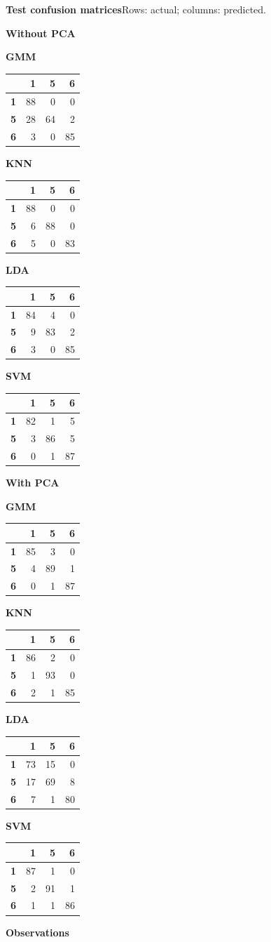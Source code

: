 \documentclass[11pt,a4paper]{article}
\makeatletter
\renewcommand{\arraystretch}{1.12}
\newcommand{\sectiongap}{\par\vspace{9mm}}
\newcommand{\confusion}[3]{%
  \begin{minipage}[t]{0.24\linewidth}
  \setlength{\parskip}{0pt}\centering
  \textbf{#1}\par\vspace{4pt}
  {\normalsize\setlength{\tabcolsep}{2.5pt}%
  \renewcommand{\arraystretch}{1.02}%
  \begin{tabular}{r@{\quad}#2}\toprule
  #3
  \bottomrule\end{tabular}}
  \end{minipage}}
\makeatother
\begin{document}
\noindent\begin{minipage}{\linewidth}
\textbf{Test confusion matrices}\hfill{\footnotesize Rows: actual; columns: predicted.}\par\smallskip
\textbf{Without PCA}\par\smallskip
\confusion{GMM}{rrr}{
 & \textbf{1} & \textbf{5} & \textbf{6} \\ \midrule
\textbf{1} & 88 & 0 & 0 \\
\textbf{5} & 28 & 64 & 2 \\
\textbf{6} & 3 & 0 & 85 \\
}\hfill
\confusion{KNN}{rrr}{
 & \textbf{1} & \textbf{5} & \textbf{6} \\ \midrule
\textbf{1} & 88 & 0 & 0 \\
\textbf{5} & 6 & 88 & 0 \\
\textbf{6} & 5 & 0 & 83 \\
}\hfill
\confusion{LDA}{rrr}{
 & \textbf{1} & \textbf{5} & \textbf{6} \\ \midrule
\textbf{1} & 84 & 4 & 0 \\
\textbf{5} & 9 & 83 & 2 \\
\textbf{6} & 3 & 0 & 85 \\
}\hfill
\confusion{SVM}{rrr}{
 & \textbf{1} & \textbf{5} & \textbf{6} \\ \midrule
\textbf{1} & 82 & 1 & 5 \\
\textbf{5} & 3 & 86 & 5 \\
\textbf{6} & 0 & 1 & 87 \\
}
\par\medskip
\textbf{With PCA}\par\smallskip
\confusion{GMM}{rrr}{
 & \textbf{1} & \textbf{5} & \textbf{6} \\ \midrule
\textbf{1} & 85 & 3 & 0 \\
\textbf{5} & 4 & 89 & 1 \\
\textbf{6} & 0 & 1 & 87 \\
}\hfill
\confusion{KNN}{rrr}{
 & \textbf{1} & \textbf{5} & \textbf{6} \\ \midrule
\textbf{1} & 86 & 2 & 0 \\
\textbf{5} & 1 & 93 & 0 \\
\textbf{6} & 2 & 1 & 85 \\
}\hfill
\confusion{LDA}{rrr}{
 & \textbf{1} & \textbf{5} & \textbf{6} \\ \midrule
\textbf{1} & 73 & 15 & 0 \\
\textbf{5} & 17 & 69 & 8 \\
\textbf{6} & 7 & 1 & 80 \\
}\hfill
\confusion{SVM}{rrr}{
 & \textbf{1} & \textbf{5} & \textbf{6} \\ \midrule
\textbf{1} & 87 & 1 & 0 \\
\textbf{5} & 2 & 91 & 1 \\
\textbf{6} & 1 & 1 & 86 \\
}
\sectiongap
\textbf{Observations}\par


\end{minipage}
\end{document}

